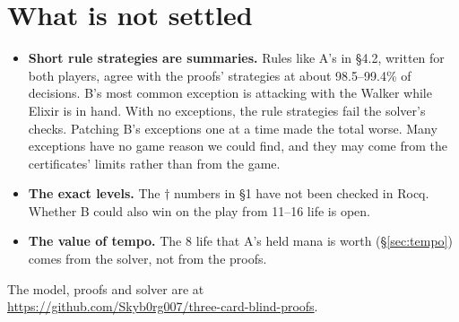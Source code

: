 \documentclass[11pt]{article}
\begin{document}
\section{What is not settled}
\begin{itemize}
\item \textbf{Short rule strategies are summaries.} Rules like A's in
  \S4.2, written for both players, agree with the proofs' strategies at about 98.5--99.4\% of decisions. B's
  most common exception is attacking with the Walker while Elixir is in
  hand. With no exceptions, the rule strategies fail the solver's checks.
  Patching B's exceptions one at a time made the total worse. Many
  exceptions have no game reason we could find, and they may come from
  the certificates' limits rather than from the game.
\item \textbf{The exact levels.} The $\dagger$ numbers in \S1 have not
  been checked in Rocq. Whether B could also win on the play from 11--16
  life is open.
\item \textbf{The value of tempo.} The 8 life that A's held mana is worth
  (\S\ref{sec:tempo}) comes from the solver, not from the proofs.
\end{itemize}

\noindent
The model, proofs and solver are at\\
\url{https://github.com/Skyb0rg007/three-card-blind-proofs}.
\end{document}
